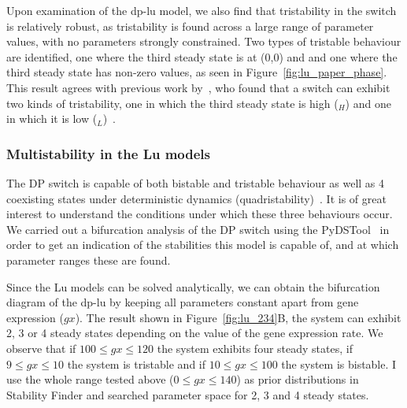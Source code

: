 Upon examination of the \acrshort{dp-lu} model, we also find that tristability in the switch is relatively robust, as tristability is found across a large range of parameter values, with no parameters strongly constrained. Two types of tristable behaviour are identified, one where the third steady state is at (0,0) and and one where the third steady state has non-zero values, as seen in Figure~\ref{fig:lu_paper_phase}. This result agrees with previous work by~\textcite{Guantes:2008gs}, who found that a switch can exhibit two kinds of tristability, one in which the third steady state is high ($_H$) and one in which it is low ($_L$)~\autocite{Guantes:2008gs}. %

\subsubsection{Multistability in the Lu models}
\label{sec:lu_234}
The DP switch is capable of both bistable and tristable behaviour as well as 4 coexisting states under deterministic dynamics (quadristability)~\autocite{Guantes:2008gs}. It is of great interest to understand the conditions under which these three behaviours occur. We carried out a bifurcation analysis of the DP switch using the PyDSTool~\autocite{Clewley:2012kj} in order to get an indication of the stabilities this model is capable of, and at which parameter ranges these are found.

Since the Lu models can be solved analytically, we can obtain the bifurcation diagram of the \acrshort{dp-lu} by keeping all parameters constant apart from gene expression ($gx$). The result shown in Figure~\ref{fig:lu_234}B, the system can exhibit 2, 3 or 4 steady states depending on the value of the gene expression rate. We observe that if $100 \leq gx\leq 120$ the system exhibits four steady states, if $9 \leq gx\leq 10$ the system is tristable and if $10 \leq gx\leq 100$ the system is bistable. I use the whole range tested above ($0 \leq gx\leq 140$) as prior distributions in Stability Finder and searched parameter space for 2, 3 and 4 steady states.

